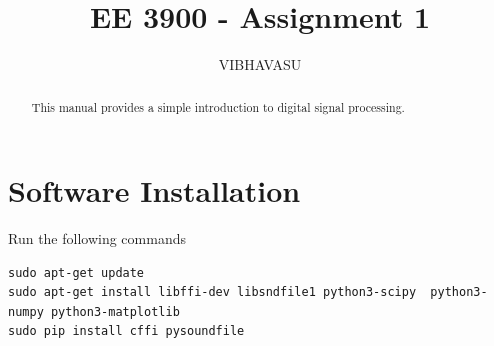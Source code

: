 \documentclass[journal,12pt,twocolumn]{IEEEtran}
\renewcommand\thesection{\arabic{section}}
\begin{document}
	\let\StandardTheFigure\thefigure
	\renewcommand{\thefigure}{\theproblem}
	
	
	
	\def\putbox#1#2#3{\makebox[0in][l]{\makebox[#1][l]{}\raisebox{\baselineskip}[0in][0in]{\raisebox{#2}[0in][0in]{#3}}}}
	\def\rightbox#1{\makebox[0in][r]{#1}}
	\def\centbox#1{\makebox[0in]{#1}}
	\def\topbox#1{\raisebox{-\baselineskip}[0in][0in]{#1}}
	\def\midbox#1{\raisebox{-0.5\baselineskip}[0in][0in]{#1}}
	
	\vspace{3cm}
	
	\title{ EE 3900 - Assignment 1}
	
	\author{VIBHAVASU}
	
	\maketitle
	
	
	\tableofcontents
	
	
	\renewcommand{\thefigure}{\theenumi}
	\renewcommand{\thetable}{\theenumi}
	
	
	
	\bigskip
	
	\begin{abstract}
		This manual provides a simple introduction to digital signal processing.
	\end{abstract}
	\section{Software Installation}
	Run the following commands
	\begin{lstlisting}
sudo apt-get update
sudo apt-get install libffi-dev libsndfile1 python3-scipy  python3-numpy python3-matplotlib 
sudo pip install cffi pysoundfile 
	\end{lstlisting}
\end{document}
